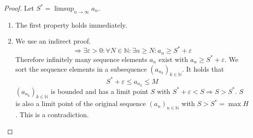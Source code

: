 \documentclass[a4paper,landscape,twocolumn]{article}
\theoremstyle{definition}
\newcommand\seq[1]{{\left(#1\right)}_{n \in \mathbb N}}
\begin{document}
\begin{proof}
  Let $S^* = \limsup_{n\to\infty} a_n$.
  \begin{enumerate}
    \item The first property holds immediately.
    \item
      We use an indirect proof.
      \[ \Rightarrow \exists \varepsilon > 0: \forall N \in \mathbb N: \exists n \geq N: a_n \geq S^* + \varepsilon \]
      Therefore infinitely many sequence elements $a_n$ exist with $a_n \geq S^* + \varepsilon$.
      We sort the sequence elements in a subsequence $\left(a_{n_k}\right)_{k \in \mathbb N}$.
      It holds that
      \[ S^* + \varepsilon \leq a_{n_k} \leq M \]
      $\left(a_{n_k}\right)_{k \in \mathbb N}$ is bounded and has a limit point $S$
      with $S^* + \varepsilon < S \Rightarrow S > S^*$.
      $S$ is also a limit point of the original sequence $\seq{a_n}$ with $S > S^* = \max{H}$.
      This is a contradiction.
  \end{enumerate}
\end{proof}
\end{document}
